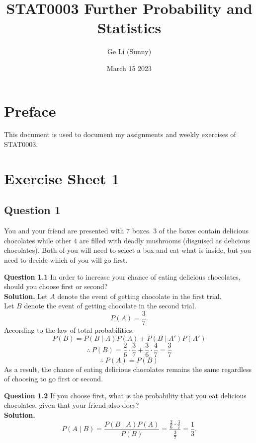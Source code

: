 \documentclass[
]{book}
\title{STAT0003 Further Probability and Statistics}
\author{Ge Li (Sunny)}
\date{March 15 2023}
\begin{document}
\maketitle

{
\setcounter{tocdepth}{1}
\tableofcontents
}
\chapter*{Preface}\label{preface}

This document is used to document my assignments and weekly exercises of STAT0003.

\chapter{Exercise Sheet 1}\label{exercise-sheet-1}

\section{Question 1}\label{question-1}

You and your friend are presented with \(7\) boxes. \(3\) of the boxes contain delicious chocolates while other \(4\) are filled with deadly mushrooms (disguised as delicious chocolates). Both of you will need to select a box and eat what is inside, but you need to decide which of you will go first.

\textbf{Question 1.1} In order to increase your chance of eating delicious chocolates, should you choose first or second?\\
\textbf{Solution.} Let \(A\) denote the event of getting chocolate in the first trial.\\
Let \(B\) denote the event of getting chocolate in the second trial.\\
\[P(A) = \frac{3}{7}.\] According to the law of total probabilities: \[P(B) = P(B \mid A)P(A) + P(B \mid A')P(A')\] \[\therefore \ P(B) = \frac{2}{6} \cdot \frac{3}{7} + \frac{3}{6} \cdot \frac{4}{7} = \frac{3}{7}\] \[\therefore \ P(A) = P(B)\]
As a result, the chance of eating delicious chocolates remains the same regardless of choosing to go first or second.

\textbf{Question 1.2} If you choose first, what is the probability that you eat delicious chocolates, given that your friend also does?\\
\textbf{Solution.} \[P(A \mid B) = \frac{P(B \mid A) P(A)}{P(B)} = \frac{\frac{2}{6} \cdot \frac{3}{7}}{\frac{3}{7}} = \frac{1}{3}.\]
\end{document}
